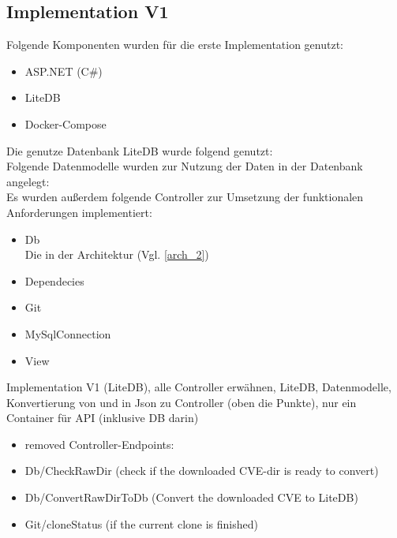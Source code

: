 \subsection{Implementation V1} \label{sec:Implementation1}
    Folgende Komponenten wurden für die erste Implementation genutzt:
    \begin{itemize}
        \item ASP.NET (C\#)
        \item LiteDB
        \item Docker-Compose
    \end{itemize}
    Die genutze Datenbank LiteDB wurde folgend genutzt:\\ %
    Folgende Datenmodelle wurden zur Nutzung der Daten in der Datenbank angelegt:\\ %
    Es wurden außerdem folgende Controller zur Umsetzung der funktionalen Anforderungen implementiert:
    \begin{itemize}
        \item Db \\
            Die in der Architektur (Vgl. \ref{arch_2})
        \item Dependecies
        \item Git
        \item MySqlConnection
        \item View
    \end{itemize}

    Implementation V1 (LiteDB), alle Controller erwähnen, LiteDB, Datenmodelle, Konvertierung von und in Json zu Controller (oben die Punkte), nur ein Container für \ac{API} (inklusive DB darin)
    \begin{itemize}
        \item removed Controller-Endpoints:
        \item Db/CheckRawDir (check if the downloaded \ac{CVE}-dir is ready to convert)
        \item Db/ConvertRawDirToDb (Convert the downloaded \ac{CVE} to LiteDB)
        \item Git/cloneStatus (if the current clone is finished)
    \end{itemize}